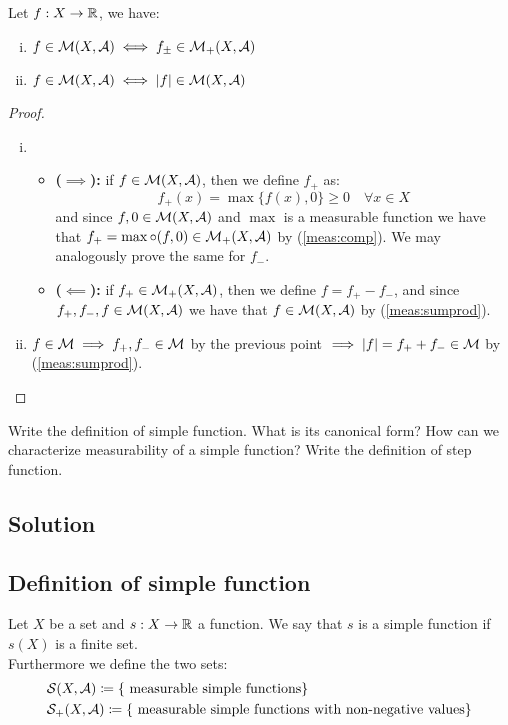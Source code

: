 Let $f:X\to\mathbb{R}$, we have:
\begin{enumerate}[i)]
    \item $f \in \mathcal{M}(X, \mathcal{A}) \iff f_{\pm} \in \mathcal{M}_+(X, \mathcal{A})$
    \item $f \in \mathcal{M}(X, \mathcal{A}) \iff |f| \in \mathcal{M}(X, \mathcal{A})$
\end{enumerate}

\begin{proof}
    \hspace*{\fill} %
    \begin{enumerate} [i)]
        \item \begin{itemize}
            \item \textbf{($\implies$):} if $f \in \mathcal{M}(X, \mathcal{A})$, then we define $f_+$ as:
            \[
                f_+(x) = \max\{f(x),0\} \geq 0 \quad \forall x\in X
            \]
            and since $f,0 \in \mathcal{M}(X,\mathcal{A})$ and $\max$ is a measurable function we have that $f_+ = \max \circ (f,0) \in \mathcal{M}_+(X,\mathcal{A})$ by (\ref{meas:comp}). We may analogously prove the same for $f_-$.
            \item \textbf{($\impliedby$):} if $f_+ \in \mathcal{M}_+(X, \mathcal{A})$, then we define $f = f_+ - f_-$, and since $f_+,f_-,f \in \mathcal{M}(X,\mathcal{A})$ we have that $f \in \mathcal{M}(X,\mathcal{A})$ by (\ref{meas:sumprod}).
        \end{itemize}
        \item $f\in\mathcal{M} \implies f_{+}, f_{-} \in \mathcal{M}$ by the previous point $\implies |f|=f_+ + f_- \in \mathcal{M}$ by (\ref{meas:sumprod}).
    \end{enumerate}
\end{proof}


\question

Write the definition of simple function. What is its canonical form? How can we characterize measurability of a simple function? Write the definition of step function.

\subsection*{Solution}

\subsection{Definition of simple function}
Let $X$ be a set and $s:X\to\mathbb{R}$ a function. We say that $s$ is a simple function if $s(X)$ is a finite set. \\
Furthermore we define the two sets:
\begin{align*}
    & \mathcal{S}(X, \mathcal{A}) \coloneqq \{ \text{ measurable simple functions}  \} \\
    & \mathcal{S}_+(X, \mathcal{A}) \coloneqq \{ \text{ measurable simple functions with non-negative values} \} 
\end{align*}

